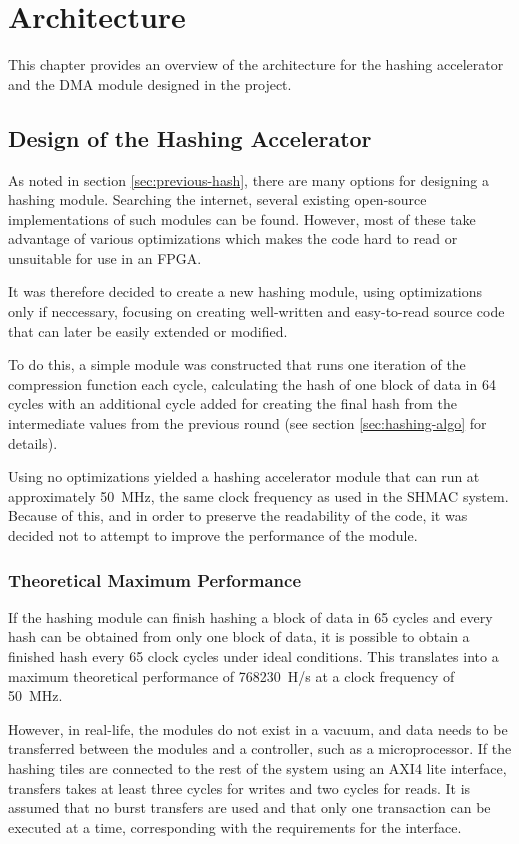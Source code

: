 \chapter{Architecture}

This chapter provides an overview of the architecture for the hashing
accelerator and the DMA module designed in the project.

\section{Design of the Hashing Accelerator}

As noted in section \ref{sec:previous-hash}, there are many options for
designing a hashing module. Searching the internet, several existing open-source
implementations of such modules can be found. However, most of these
take advantage of various optimizations which makes the code hard to
read or unsuitable for use in an FPGA.

It was therefore decided to create a new hashing module, using optimizations
only if neccessary, focusing on creating well-written and easy-to-read source
code that can later be easily extended or modified.

To do this, a simple module was constructed that runs one iteration of
the compression function each cycle, calculating the hash of one block
of data in 64 cycles with an additional cycle added for creating the
final hash from the intermediate values from the previous round (see
section \ref{sec:hashing-algo} for details).

Using no optimizations yielded a hashing accelerator module that can
run at approximately 50~MHz, the same clock frequency as used in the SHMAC system.
Because of this, and in order to preserve the readability of the code, it
was decided not to attempt to improve the performance of the module.

\subsection{Theoretical Maximum Performance}
If the hashing module can finish hashing a block of data in 65 cycles and
every hash can be obtained from only one block of data, it is possible to
obtain a finished hash every 65 clock cycles under ideal conditions. This
translates into a maximum theoretical performance of 768230~H/s at a clock
frequency of 50~MHz.

However, in real-life, the modules do not exist in a vacuum, and data needs to be transferred
between the modules and a controller, such as a microprocessor. If the hashing tiles
are connected to the rest of the system using an AXI4 lite interface, transfers
takes at least three cycles for writes and two cycles for reads.
It is assumed that no burst transfers are used and that only one transaction
can be executed at a time, corresponding with the requirements for the interface.

